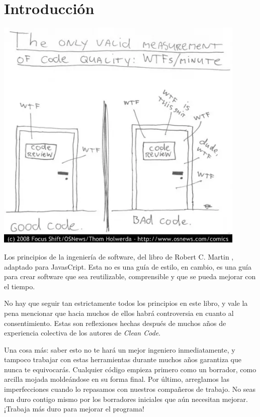 \documentclass[a4paper, 12pt]{article}
\begin{document}
\begin{center}
	\huge\textbf{}

	\vspace{0.5cm} %
\end{center}

\section{Introducción}

\begin{center}
  \includegraphics[width=12cm]{introduction_bad_code} %
	\vspace{0.5cm} %
\end{center}

Los principios de la ingeniería de software, del libro de Robert C. Martin , adaptado para JavasCript. Esta no es una guía de estilo, en cambio, es una guía para crear software que sea reutilizable, comprensible y que se pueda mejorar con el tiempo.

No hay que seguir tan estrictamente todos los principios en este libro, y vale la pena mencionar que hacia muchos de ellos habrá controversia en cuanto al consentimiento. Estas son reflexiones hechas después de muchos años de experiencia colectiva de los autores de \textit{Clean Code}.

Una cosa más: saber esto no te hará un mejor ingeniero inmediatamente, y tampoco trabajar con estas herramientas durante muchos años garantiza que nunca te equivocarás. Cualquier código empieza primero como un borrador, como arcilla mojada moldeándose en su forma final. Por último, arreglamos las imperfecciones cuando lo repasamos con nuestros compañeros de trabajo. No seas tan duro contigo mismo por los borradores iniciales que aún necesitan mejorar. ¡Trabaja más duro para mejorar el programa!
\end{document}
